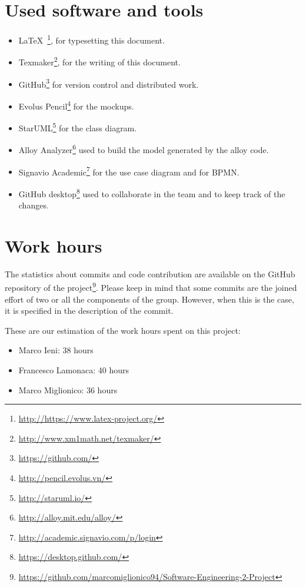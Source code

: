 \section{Used software and tools}
\begin{itemize}
    \item \LaTeX\ \footnote{\url{http://https://www.latex-project.org/}}, for typesetting this document.
    \item Texmaker\footnote{\url{http://www.xm1math.net/texmaker/}}, for the writing of this document.
    \item GitHub\footnote{\url{https://github.com/}} for version control and distributed work.
    \item Evolus Pencil\footnote{\url{http://pencil.evolus.vn/}} for the mockups.
    \item StarUML\footnote{\url{http://staruml.io/}} for the class diagram.
    \item Alloy Analyzer\footnote{\url{http://alloy.mit.edu/alloy/}} used to build the model generated by the alloy code.
    \item Signavio Academic\footnote{\url{http://academic.signavio.com/p/login}} for the use case diagram and for BPMN.
    \item GitHub desktop\footnote{\url{https://desktop.github.com/}} used to collaborate in the team and to keep track of the changes. 
\end{itemize}

\section{Work hours}
The statistics about commits and code contribution are available on the GitHub repository of the project\footnote{\url{https://github.com/marcomiglionico94/Software-Engineering-2-Project}}.
Please keep in mind that some commits are the joined effort of two or all the components of the group. However, when this is the case, it is specified in the description of the commit.

These are our estimation of the work hours spent on this project:
\begin{itemize}
    \item Marco Ieni: 38 hours
    \item Francesco Lamonaca: 40 hours
    \item Marco Miglionico: 36 hours
\end{itemize}
